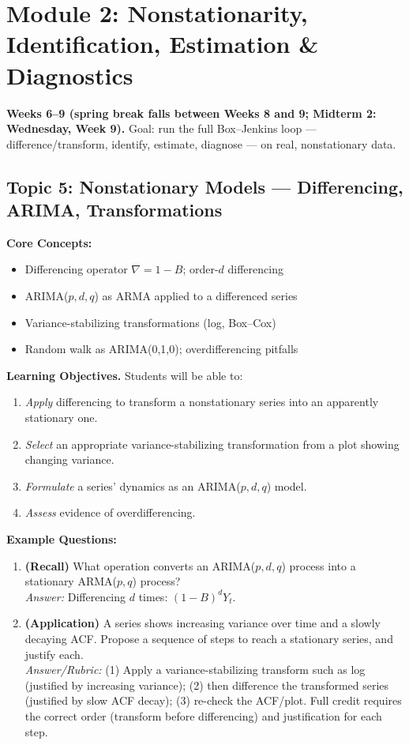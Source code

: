 \documentclass[11pt]{article}
\begin{document}
\section{Module 2: Nonstationarity, Identification, Estimation \& Diagnostics}
\textbf{Weeks 6--9 (spring break falls between Weeks 8 and 9; Midterm 2: Wednesday, Week 9).} Goal: run the full Box--Jenkins loop --- difference/transform, identify, estimate, diagnose --- on real, nonstationary data.

\subsection{Topic 5: Nonstationary Models --- Differencing, ARIMA, Transformations}

\textbf{Core Concepts:}
\begin{itemize}
\item Differencing operator $\nabla = 1-B$; order-$d$ differencing
\item ARIMA($p,d,q$) as ARMA applied to a differenced series
\item Variance-stabilizing transformations (log, Box--Cox)
\item Random walk as ARIMA(0,1,0); overdifferencing pitfalls
\end{itemize}

\textbf{Learning Objectives.} Students will be able to:
\begin{enumerate}
\item \emph{Apply} differencing to transform a nonstationary series into an apparently stationary one.
\item \emph{Select} an appropriate variance-stabilizing transformation from a plot showing changing variance.
\item \emph{Formulate} a series' dynamics as an ARIMA($p,d,q$) model.
\item \emph{Assess} evidence of overdifferencing.
\end{enumerate}

\textbf{Example Questions:}
\begin{enumerate}
\item \textbf{(Recall)} What operation converts an ARIMA($p,d,q$) process into a stationary ARMA($p,q$) process? \\
\emph{Answer:} Differencing $d$ times: $(1-B)^d Y_t$.
\item \textbf{(Application)} A series shows increasing variance over time and a slowly decaying ACF. Propose a sequence of steps to reach a stationary series, and justify each. \\
\emph{Answer/Rubric:} (1) Apply a variance-stabilizing transform such as log (justified by increasing variance); (2) then difference the transformed series (justified by slow ACF decay); (3) re-check the ACF/plot. Full credit requires the correct order (transform before differencing) and justification for each step.
\end{enumerate}
\end{document}
